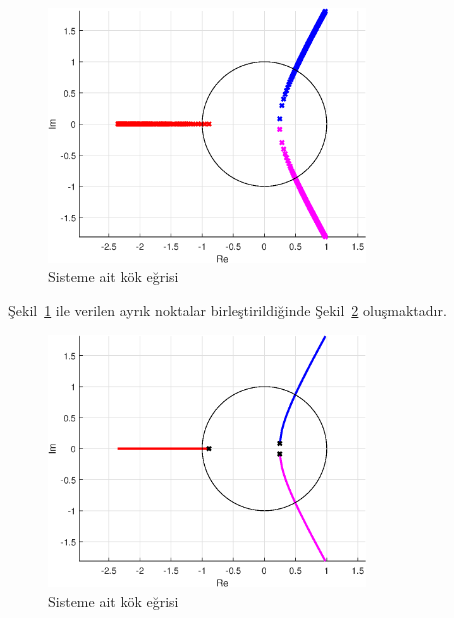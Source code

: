 \begin{figure}[!htb]
    \centering
    \includegraphics[width=0.75\textwidth]{img/lec5_rlocus1}
    \caption{Sisteme ait kök eğrisi}
    \label{fig:lec5_rlocus1}
\end{figure}

Şekil~\ref{fig:lec5_rlocus1} ile verilen ayrık noktalar birleştirildiğinde Şekil~\ref{fig:lec5_rlocus2} oluşmaktadır.
\begin{figure}[!htb]
    \centering
    \includegraphics[width=0.75\textwidth]{img/lec5_rlocus2}
    \caption{Sisteme ait kök eğrisi}
    \label{fig:lec5_rlocus2}
\end{figure}

